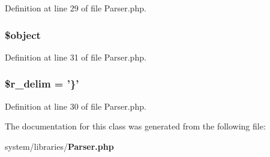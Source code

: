 Definition at line 29 of file Parser.\-php.

\subsubsection[{\$object}]{\setlength{\rightskip}{0pt plus 5cm}\$object}\label{class_c_i___parser_a52123b83a1952a68c5513e47d59ec4a6}


Definition at line 31 of file Parser.\-php.

\subsubsection[{\$r\-\_\-delim}]{\setlength{\rightskip}{0pt plus 5cm}\$r\-\_\-delim = '\}'}\label{class_c_i___parser_a4d80dc6a622989846dbd0e39fde0f3bb}


Definition at line 30 of file Parser.\-php.



The documentation for this class was generated from the following file\-:\begin{DoxyCompactItemize}
\item 
system/libraries/{\bf Parser.\-php}\end{DoxyCompactItemize}
